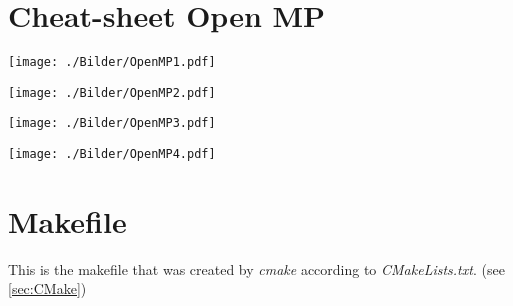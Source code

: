 \section{Cheat-sheet Open MP}

\texttt{[image: ./Bilder/OpenMP1.pdf]}

\texttt{[image: ./Bilder/OpenMP2.pdf]}

\texttt{[image: ./Bilder/OpenMP3.pdf]}

\texttt{[image: ./Bilder/OpenMP4.pdf]}




\section{Makefile}\label{sec:Makefile}
This is the makefile that was created by \textit{cmake} according to \textit{CMakeLists.txt}. (see \ref{sec:CMake})


